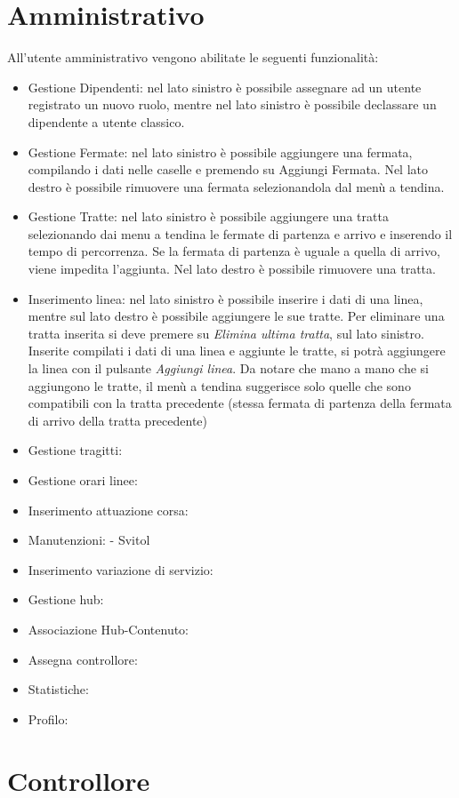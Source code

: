 \documentclass[12pt,a4paper]{report}
\begin{document}
\section{Amministrativo}
All'utente amministrativo vengono abilitate le seguenti funzionalità:
\begin{itemize}
    \item Gestione Dipendenti: nel lato sinistro è possibile assegnare ad un utente registrato un nuovo ruolo, mentre nel lato sinistro è possibile declassare un dipendente a utente classico.
    \item Gestione Fermate: nel lato sinistro è possibile aggiungere una fermata, compilando i dati nelle caselle e premendo su Aggiungi Fermata. Nel lato destro è possibile rimuovere una fermata selezionandola dal menù a tendina.
    \item Gestione Tratte: nel lato sinistro è possibile aggiungere una tratta selezionando dai menu a tendina le fermate di partenza e arrivo e inserendo il tempo di percorrenza. Se la fermata di partenza è uguale a quella di arrivo, viene impedita l'aggiunta. Nel lato destro è possibile rimuovere una tratta.
    \item Inserimento linea: nel lato sinistro è possibile inserire i dati di una linea, mentre sul lato destro è possibile aggiungere le sue tratte. Per eliminare una tratta inserita si deve premere su \textit{Elimina ultima tratta}, sul lato sinistro. Inserite compilati i dati di una linea e aggiunte le tratte, si potrà aggiungere la linea con il pulsante \textit{Aggiungi linea}. Da notare che mano a mano che si aggiungono le tratte, il menù a tendina suggerisce solo quelle che sono compatibili con la tratta precedente (stessa fermata di partenza della fermata di arrivo della tratta precedente)
    \item Gestione tragitti:
    \item Gestione orari linee:
    \item Inserimento attuazione corsa:
    \item Manutenzioni: - Svitol
    \item Inserimento variazione di servizio:
    \item Gestione hub:
    \item Associazione Hub-Contenuto:
    \item Assegna controllore:
    \item Statistiche:
    \item Profilo:
\end{itemize}
\section{Controllore}
\end{document}
